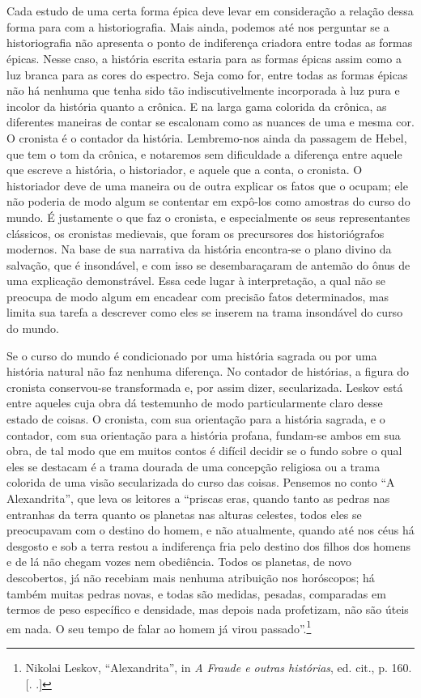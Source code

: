 \section{}

Cada estudo de uma certa forma épica deve levar em consideração a
relação dessa forma para com a historiografia. Mais ainda, podemos até
nos perguntar se a historiografia não apresenta o ponto de indiferença
criadora entre todas as formas épicas. Nesse caso, a história escrita
estaria para as formas épicas assim como a luz branca para as cores do
espectro. Seja como for, entre todas as formas épicas não há nenhuma que
tenha sido tão indiscutivelmente incorporada à luz pura e incolor da
história quanto a crônica. E na larga gama colorida da crônica, as
diferentes maneiras de contar se escalonam como as nuances de uma e
mesma cor. O cronista é o contador da história. Lembremo-nos ainda da
passagem de Hebel, que tem o tom da crônica, e notaremos sem dificuldade
a diferença entre aquele que escreve a história, o historiador, e aquele
que a conta, o cronista. O historiador deve de uma maneira ou de outra
explicar os fatos que o ocupam; ele não poderia de modo algum se
contentar em expô-los como amostras do curso do mundo. É justamente o
que faz o cronista, e especialmente os seus representantes clássicos, os
cronistas medievais, que foram os precursores dos historiógrafos
modernos. Na base de sua narrativa da história encontra-se o plano
divino da salvação, que é insondável, e com isso se desembaraçaram de
antemão do ônus de uma explicação demonstrável. Essa cede lugar à
interpretação, a qual não se preocupa de modo algum em encadear com
precisão fatos determinados, mas limita sua tarefa a descrever como
eles se inserem na trama insondável do curso do mundo.

Se o curso do mundo é condicionado por uma história sagrada ou por uma
história natural não faz nenhuma diferença. No contador de histórias, a
figura do cronista conservou-se transformada e, por assim dizer,
secularizada. Leskov está entre aqueles cuja obra dá testemunho de modo
particularmente claro desse estado de coisas. O cronista, com sua
orientação para a história sagrada, e o contador, com sua orientação
para a história profana, fundam-se ambos em sua obra, de tal modo que em
muitos contos é difícil decidir se o fundo sobre o qual eles se
destacam é a trama dourada de uma concepção religiosa ou a trama
colorida de uma visão secularizada do curso das coisas. Pensemos no
conto ``A Alexandrita'', que leva os leitores a ``priscas eras, quando
tanto as pedras nas entranhas da terra quanto os planetas nas alturas
celestes, todos eles se preocupavam com o destino do homem, e não
atualmente, quando até nos céus há desgosto e sob a terra restou a
indiferença fria pelo destino dos filhos dos homens e de lá não chegam
vozes nem obediência. Todos os planetas, de novo descobertos, já não
recebiam mais nenhuma atribuição nos horóscopos; há também muitas pedras
novas, e todas são medidas, pesadas, comparadas em termos de peso
específico e densidade, mas depois nada profetizam, não são úteis em
nada. O seu tempo de falar ao homem já virou passado''.\footnote{Nikolai
  Leskov, ``Alexandrita'', in \emph{A Fraude e outras histórias}, ed.
  cit., p. 160. [. .]}

